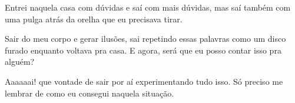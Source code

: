 Entrei naquela casa com dúvidas e saí com mais dúvidas, mas saí também com uma pulga atrás da orelha que eu precisava tirar. 

Sair do meu corpo e gerar ilusões, sai repetindo essas palavras como um disco furado enquanto voltava pra casa. E agora, será que eu posso contar isso pra alguém?

Aaaaaai! que vontade de sair por aí experimentando tudo isso. Só preciso me lembrar de como eu consegui naquela situação.




